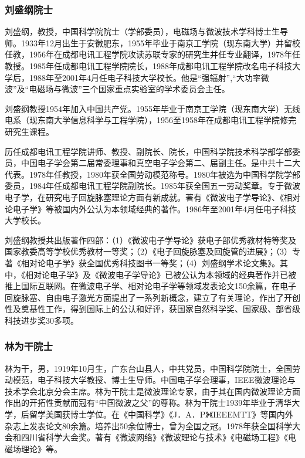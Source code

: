\documentclass[UTF8]{ctexart}
\begin{document}
    \subsubsection{刘盛纲院士}

刘盛纲，教授，中国科学院院士（学部委员），电磁场与微波技术学科博士生导师。1933年12月出生于安徽肥东，1955年毕业于南京工学院（现东南大学）并留校任教，1956年在成都电讯工程学院攻读苏联专家的研究生并任专业翻译，1978年任教授。1985年任成都电讯工程学院院长，1988年成都电讯工程学院改名电子科技大学后，1988年至2001年4月任电子科技大学校长。他是“强辐射”,“大功率微波”及“电磁场与微波”三个国家重点实验室的学术委员会主任。

刘盛纲教授1954年加入中国共产党。1955年毕业于南京工学院（现东南大学）无线电系（现东南大学信息科学与工程学院），1956至1958年在成都电讯工程学院修完研究生课程。

历任成都电讯工程学院讲师、教授、副院长、院长，中国科学院技术科学部学部委员，中国电子学会第二届常委理事和真空电子学会第二、届副主任。是中共十二大代表。1978年任教授，1980年获全国劳动模范称号。1980年被选为中国科学院学部委员，1984年任成都电讯工程学院副院长。1985年获全国五一劳动奖章。专于微波电子学，在研究电子回旋脉塞理论方面有新成就。著有《微波电子学导论》、《相对论电子学》等被国内外公认为本领域经典的著作。1986年至2001年4月任电子科技大学校长。

刘盛纲教授共出版著作四部：（1）《微波电子学导论》获电子部优秀教材特等奖及国家教委高等学校优秀教材一等奖；（2）《电子回旋脉塞及回旋管的进展》；（3）专著《相对论电子学》获全国优秀科技图书一等奖；（4）刘盛纲学术论文集》。其中，《相对论电子学》及《微波电子学导论》已被公认为本领域的经典著作并已被推上国际互联网。在微波电子学、相对论电子学等领域发表论文150余篇，在电子回旋脉塞、自由电子激光方面提出了一系列新概念，建立了有关理论，作出了开创性及奠基性工作，得到国际上的公认和好评，获国家自然科学奖、国家级、部省级科技进步奖30多项。

    \subsubsection{林为干院士}

林为干，男，1919年10月生，广东台山县人，中共党员，中国科学院院士，全国劳动模范，电子科技大学教授、博士生导师。中国电子学会理事，IEEE微波理论与技术学会北京分会主席。林为干院士是微波理论专家，由于其在国内微波理论方面作出的开拓性贡献而冠有“中国微波之父”的尊称。林为干院士1939年毕业于清华大学，后留学美国获博士学位。在《中国科学》《J．A．P》《IEEEMTT》等国内外杂志上发表论文80余篇。培养出50余位博士，曾为全国之冠。1978年获全国科学大会和四川省科学大会奖。著有《微波网络》《微波理论与技术》《电磁场工程》《电磁场理论》等。
\end{document}
